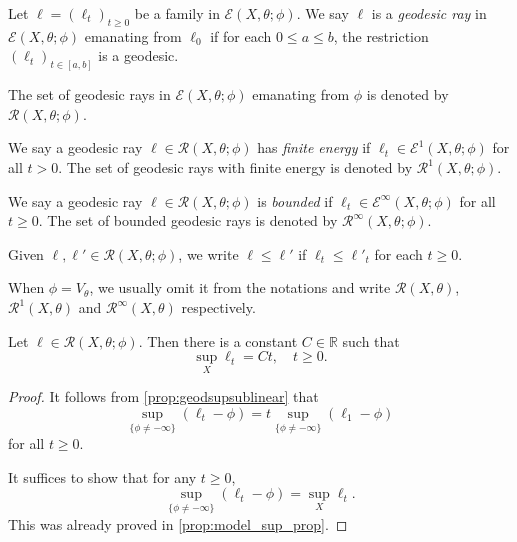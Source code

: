 \begin{definition}\label{def:geodraydef}
    Let $\ell=(\ell_t)_{t\geq 0}$ be a family in $\mathcal{E}(X,\theta;\phi)$. We say $\ell$ is a \emph{geodesic ray} in $\mathcal{E}(X,\theta;\phi)$ emanating from $\ell_0$ if for each $0\leq a\leq b$, the restriction $(\ell_t)_{t\in [a,b]}$ is a geodesic.

    The set of geodesic rays in $\mathcal{E}(X,\theta;\phi)$ emanating from $\phi$ is denoted by $\mathcal{R}(X,\theta;\phi)$.

    We say a geodesic ray $\ell\in \mathcal{R}(X,\theta;\phi)$ has \emph{finite energy} if $\ell_t\in \mathcal{E}^1(X,\theta;\phi)$ for all $t>0$. The set of geodesic rays with finite energy is denoted by $\mathcal{R}^1(X,\theta;\phi)$.

    We say a geodesic ray $\ell\in \mathcal{R}(X,\theta;\phi)$ is \emph{bounded} if $\ell_t\in \mathcal{E}^{\infty}(X,\theta;\phi)$ for all $t\geq 0$. The set of bounded geodesic rays is denoted by $\mathcal{R}^{\infty}(X,\theta;\phi)$.

    Given $\ell,\ell'\in \mathcal{R}(X,\theta;\phi)$, we write $\ell\leq \ell'$ if $\ell_t\leq \ell'_t$ for each $t\geq 0$.

    When $\phi=V_{\theta}$, we usually omit it from the notations and write $\mathcal{R}(X,\theta)$, $\mathcal{R}^1(X,\theta)$ and $\mathcal{R}^{\infty}(X,\theta)$ respectively.
\end{definition}

\begin{proposition}\label{prop:raysuplinear}
    Let $\ell\in \mathcal{R}(X,\theta;\phi)$. Then there is a constant $C\in \mathbb{R}$ such that
    \[
        \sup_{X}\ell_t=Ct,\quad t\geq 0.
    \]
\end{proposition}
\begin{proof}
    It follows from \cref{prop:geodsupsublinear} that
    \[
    \sup_{\{\phi\neq -\infty\}}(\ell_t-\phi)=t\sup_{\{\phi\neq -\infty\}}(\ell_1-\phi)
    \]
    for all $t\geq 0$.

    It suffices to show that for any $t\geq 0$,
    \[
    \sup_{\{\phi\neq -\infty\}}(\ell_t-\phi)=\sup_X \ell_t.
    \]
    This was already proved in \cref{prop:model_sup_prop}.
\end{proof}





